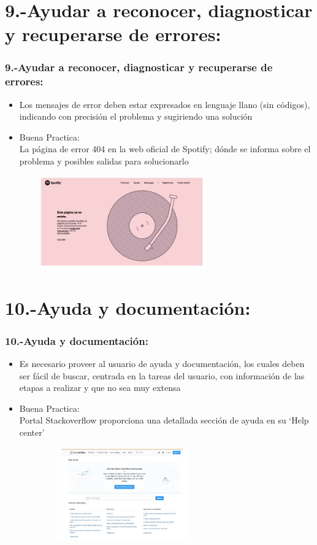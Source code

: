 \documentclass[11pt]{beamer}
\begin{document}
\section{9.-Ayudar a reconocer, diagnosticar y recuperarse de errores:}
\begin{frame}
\frametitle{9.-Ayudar a reconocer, diagnosticar y recuperarse de errores:}

\begin{itemize}
\item Los mensajes de error deben estar expresados en lenguaje llano (sin códigos), indicando con precisión el problema y sugiriendo una solución
\item Buena Practica:\\ La página de error 404 en la web oficial de Spotify; dónde se informa sobre el problema y posibles salidas para solucionarlo
\end{itemize}

\begin{figure}
  \centering
  \includegraphics[width=8.0cm,height=4.0cm]{img/Imagen9.jpg}
\end{figure}
\end{frame}

\section{10.-Ayuda y documentación:}
\begin{frame}
\frametitle{10.-Ayuda y documentación:}

\begin{itemize}
\item Es necesario proveer al usuario de ayuda y documentación, los cuales deben ser fácil de buscar, centrada en la tareas del usuario, con información de las etapas a realizar y que no sea muy extensa
\item Buena Practica:\\ Portal Stackoverflow proporciona una detallada sección de ayuda en su ‘Help center’
\end{itemize}

\begin{figure}
  \centering
  \includegraphics[width=8.0cm,height=4.0cm]{img/Imagen10.jpg}
\end{figure}
\end{frame}
\end{document}
